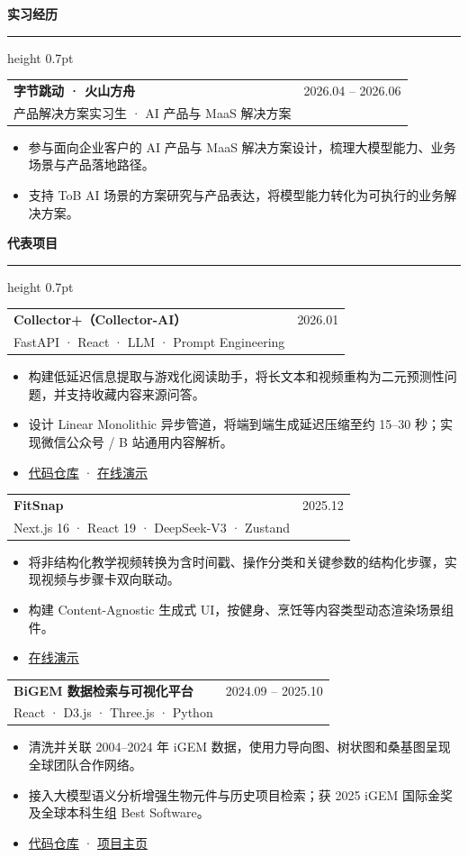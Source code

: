 \documentclass[10pt,a4paper]{article}
\makeatletter
\newcommand{\cvsection}[1]{%
  \vspace{0.72em}
  {\large\bfseries\color{Ink} #1}\par
  \vspace{0.22em}
  {\color{Rule}\hrule height 0.7pt}
  \vspace{0.36em}
}
\newcommand{\entryheading}[3]{%
  \begin{tabularx}{\textwidth}{@{}Xr@{}}
    {\bfseries\color{Ink} #1} & {\small\color{Muted} #3} \\
    {\small\color{Accent} #2} &
  \end{tabularx}
  \vspace{-0.28em}
}
\newcommand{\projectheading}[3]{%
  \begin{tabularx}{\textwidth}{@{}Xr@{}}
    {\bfseries\color{Ink} #1} & {\small\color{Muted} #3} \\
    {\small\color{Muted} #2} &
  \end{tabularx}
  \vspace{-0.28em}
}
\makeatother
\begin{document}
\cvsection{实习经历}

\entryheading{字节跳动 · 火山方舟}{产品解决方案实习生 · AI 产品与 MaaS 解决方案}{2026.04 -- 2026.06}
\begin{itemize}
  \item 参与面向企业客户的 AI 产品与 MaaS 解决方案设计，梳理大模型能力、业务场景与产品落地路径。
  \item 支持 ToB AI 场景的方案研究与产品表达，将模型能力转化为可执行的业务解决方案。
\end{itemize}

\cvsection{代表项目}

\projectheading{Collector+（Collector-AI）}{FastAPI · React · LLM · Prompt Engineering}{2026.01}
\begin{itemize}
  \item 构建低延迟信息提取与游戏化阅读助手，将长文本和视频重构为二元预测性问题，并支持收藏内容来源问答。
  \item 设计 Linear Monolithic 异步管道，将端到端生成延迟压缩至约 15--30 秒；实现微信公众号 / B 站通用内容解析。
  \item \href{https://github.com/Sophie618/Creator_ai}{代码仓库} · \href{https://collectorai.top/}{在线演示}
\end{itemize}

\vspace{0.2em}
\projectheading{FitSnap}{Next.js 16 · React 19 · DeepSeek-V3 · Zustand}{2025.12}
\begin{itemize}
  \item 将非结构化教学视频转换为含时间戳、操作分类和关键参数的结构化步骤，实现视频与步骤卡双向联动。
  \item 构建 Content-Agnostic 生成式 UI，按健身、烹饪等内容类型动态渲染场景组件。
  \item \href{https://fit-snap-beige.vercel.app/}{在线演示}
\end{itemize}

\vspace{0.2em}
\projectheading{BiGEM 数据检索与可视化平台}{React · D3.js · Three.js · Python}{2024.09 -- 2025.10}
\begin{itemize}
  \item 清洗并关联 2004--2024 年 iGEM 数据，使用力导向图、树状图和桑基图呈现全球团队合作网络。
  \item 接入大模型语义分析增强生物元件与历史项目检索；获 2025 iGEM 国际金奖及全球本科生组 Best Software。
  \item \href{https://gitlab.igem.org/2025/software-tools/bit-china}{代码仓库} · \href{https://2025.igem.wiki/bit-china/software}{项目主页}
\end{itemize}
\end{document}
